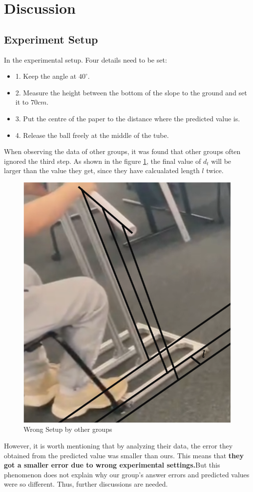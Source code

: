 \documentclass{article}
\begin{document}
\section{Discussion}
    \subsection{Experiment Setup}
    In the experimental setup. Four details need to be set:
    \begin{itemize}
        \item 1. Keep the angle at $40^\circ$.
        \item 2. Measure the height between the bottom of the slope to the ground and set it to $70cm$.
        \item 3. Put the centre of the paper to the distance where the predicted value is.
        \item 4. Release the ball freely at the middle of the tube.
    \end{itemize}
    When observing the data of other groups, it was found that other groups often ignored the third step. As shown in the figure \ref{fig:wrong_setup}, the final value of $d_t$ will be larger than the value they get, since they have calcualated length $l$ twice.
    \begin{figure}[H]
        \centering
        \includegraphics[width=0.35\linewidth]{wrong_setup.png}
        \caption{Wrong Setup by other groups}
        \label{fig:wrong_setup}
    \end{figure}
    However, it is worth mentioning that by analyzing their data, the error they obtained from the predicted value was smaller than ours. This means that \textbf{they got a smaller error due to wrong experimental settings.}But this phenomenon does not explain why our group's answer errors and predicted values were so different. Thus, further discussions are needed.
\end{document}
